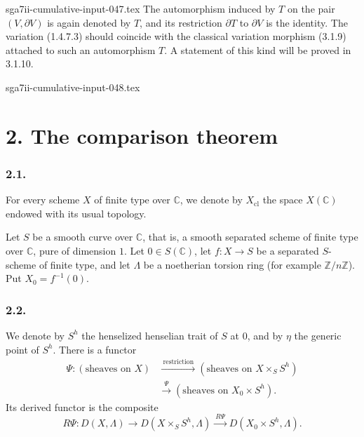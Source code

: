 \begin{filecontents*}{sga7ii-cumulative-input-047.tex}
The automorphism induced by $T$ on the pair $(V,\partial V)$ is again
denoted by $T$, and its restriction $\partial T$ to $\partial V$ is
the identity.  The variation (1.4.7.3) should coincide with the
classical variation morphism (3.1.9) attached to such an automorphism
$T$.  A statement of this kind will be proved in 3.1.10.

\end{filecontents*}
\begin{filecontents*}{sga7ii-cumulative-input-048.tex}
\section*{2. The comparison theorem}

\subsubsection*{2.1.}
For every scheme $X$ of finite type over $\mathbb C$, we denote by
$X_{\mathrm{cl}}$ the space $X(\mathbb C)$ endowed with its usual
topology.

Let $S$ be a smooth curve over $\mathbb C$, that is, a smooth
separated scheme of finite type over $\mathbb C$, pure of dimension
$1$.  Let $0\in S(\mathbb C)$, let $f:X\longrightarrow S$ be a
separated $S$-scheme of finite type, and let $\Lambda$ be a
noetherian torsion ring (for example $\mathbb Z/n\mathbb Z$).  Put
$X_0=f^{-1}(0)$.

\subsubsection*{2.2.}
We denote by $S^h$ the henselized henselian trait of $S$ at $0$, and
by $\eta$ the generic point of $S^h$.  There is a functor
\[
\begin{aligned}
\Psi:(\text{sheaves on }X)
&\xrightarrow{\ \mathrm{restriction}\ }
(\text{sheaves on }X\times_SS^h)\\
&\xrightarrow{\ \Psi\ }
(\text{sheaves on }X_0\times S^h).
\end{aligned}
\]
Its derived functor is the composite
\[
R\Psi:D(X,\Lambda)
\longrightarrow D(X\times_SS^h,\Lambda)
\xrightarrow{\ R\Psi\ }D(X_0\times S^h,\Lambda).
\]


\end{filecontents*}
